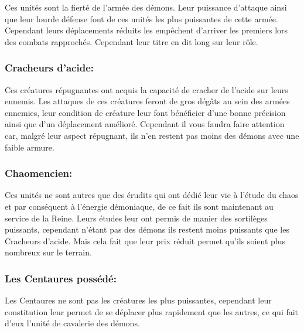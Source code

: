 \documentclass[a4paper]{article}
\begin{document}
	\quad Ces unités sont la fierté de l'armée des démons. Leur puissance d'attaque ainsi que leur lourde défense font de ces unités les plus puissantes de cette armée. Cependant leurs déplacements réduits les empêchent d'arriver les premiers lors des combats rapprochés. Cependant leur titre en dit long sur leur rôle.
	
	\subsubsection{Cracheurs d'acide: }
	
	\quad Ces créatures répugnantes ont acquis la capacité de cracher de l'acide sur leurs ennemis. Les attaques de ces créatures feront de gros dégâts au sein des armées ennemies, leur condition de créature leur font bénéficier d'une bonne précision ainsi que d'un déplacement amélioré. Cependant il vous faudra faire attention car, malgré leur aspect répugnant, ils n'en restent pas moins des démons avec une faible armure.
	
	\subsubsection{Chaomencien: }
	
	\quad Ces unités ne sont autres que des érudits qui ont dédié leur vie à l'étude du chaos et par conséquent à l'énergie démoniaque, de ce fait ils sont maintenant au service de la Reine. Leurs études leur ont permis de manier des sortilèges puissants, cependant n'étant pas des démons ils restent moins puissants que les Cracheurs d'acide. Mais cela fait que leur prix réduit permet qu'ils soient plus nombreux sur le terrain.
	
	\subsubsection{Les Centaures possédé: }
	
	\quad Les Centaures ne sont pas les créatures les plus puissantes, cependant leur constitution leur permet de se déplacer plus rapidement que les autres, ce qui fait d'eux l'unité de cavalerie des démons.
	
\end{document}
